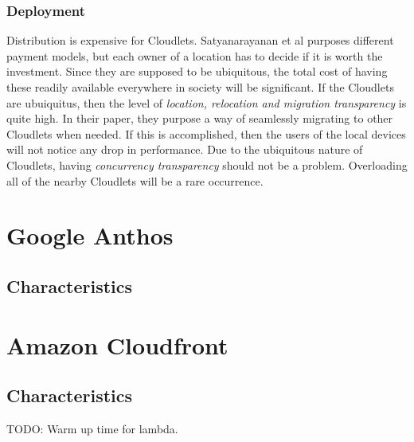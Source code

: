 \subsubsection{Deployment}
Distribution is expensive for Cloudlets. Satyanarayanan et al\cite{satyanarayanan_case_2009} purposes different payment models, but each owner of a location has to decide if it is worth the investment. Since they are supposed to be ubiquitous, the total cost of having these readily available everywhere in society will be significant. If the Cloudlets are ubuiquitus, then the level of \textit{location, relocation and migration transparency} is quite high. In their paper, they purpose a way of seamlessly migrating to other Cloudlets when needed. If this is accomplished, then the users of the local devices will not notice any drop in performance. Due to the ubiquitous nature of Cloudlets, having \textit{concurrency transparency} should not be a problem. Overloading all of the nearby Cloudlets will be a rare occurrence.














\section{Google Anthos}
\subsection{Characteristics}
















\section{Amazon Cloudfront}
\subsection{Characteristics}
TODO: Warm up time for lambda.





